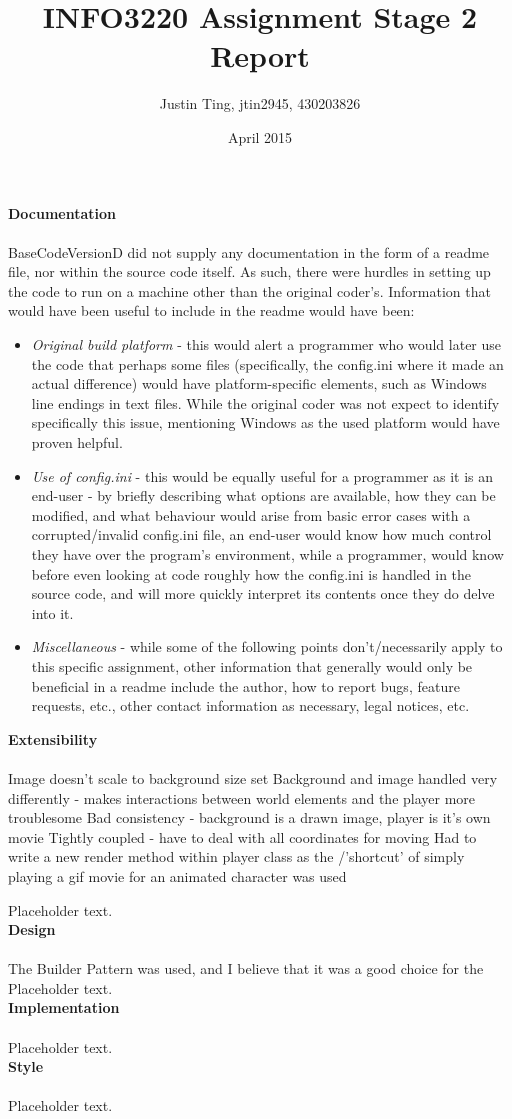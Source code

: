 \documentclass[12pt]{article}
\title{INFO3220 Assignment Stage 2 Report}
\author{Justin Ting, jtin2945, 430203826}
\date{April 2015}
\begin{document}
\maketitle

\textbf{Documentation}\\\\
BaseCodeVersionD did not supply any documentation in the form of a readme file, nor within the source code itself. As such, there were hurdles in setting up the code to run on a machine other than the original coder's. Information that would have been useful to include in the readme would have been:\\
\begin{itemize}
\item \textit{Original build platform} - this would alert a programmer who would later use the code that perhaps some files (specifically, the config.ini where it made an actual difference) would have platform-specific elements, such as Windows line endings in text files. While the original coder was not expect to identify specifically this issue, mentioning Windows as the used platform would have proven helpful.
\item \textit{Use of config.ini} - this would be equally useful for a programmer as it is an end-user - by briefly describing what options are available, how they can be modified, and what behaviour would arise from basic error cases with a corrupted/invalid config.ini file, an end-user would know how much control they have over the program's environment, while a programmer, would know before even looking at code roughly how the config.ini is handled in the source code, and will more quickly interpret its contents once they do delve into it.
\item \textit{Miscellaneous} - while some of the following points don't/necessarily apply to this specific assignment, other information that generally would only be beneficial in a readme include the author, how to report bugs, feature requests, etc., other contact information as necessary, legal notices, etc.
\end{itemize}

\textbf{Extensibility}\\\\
        Image doesn't scale to background size set
        Background and image handled very differently - makes interactions between world elements and the player more troublesome
        Bad consistency - background is a drawn image, player is it's own movie
        Tightly coupled - have to deal with all coordinates for moving
        Had to write a new render method within player class as the /'shortcut' of simply playing a gif movie for an animated character was used

Placeholder text.\\

\textbf{Design}\\\\
The Builder Pattern was used, and I believe that it was a good choice for the
Placeholder text.\\

\textbf{Implementation}\\\\
Placeholder text.\\

\textbf{Style}\\\\
Placeholder text.\\
\end{document}
